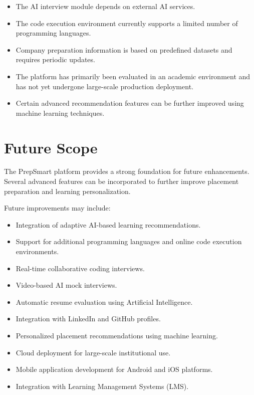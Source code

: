 \begin{itemize}

\item The AI interview module depends on external AI services.

\item The code execution environment currently supports a limited number of programming languages.

\item Company preparation information is based on predefined datasets and requires periodic updates.

\item The platform has primarily been evaluated in an academic environment and has not yet undergone large-scale production deployment.

\item Certain advanced recommendation features can be further improved using machine learning techniques.

\end{itemize}

\section{Future Scope}

The PrepSmart platform provides a strong foundation for future enhancements. Several advanced features can be incorporated to further improve placement preparation and learning personalization.

Future improvements may include:

\begin{itemize}

\item Integration of adaptive AI-based learning recommendations.

\item Support for additional programming languages and online code execution environments.

\item Real-time collaborative coding interviews.

\item Video-based AI mock interviews.

\item Automatic resume evaluation using Artificial Intelligence.

\item Integration with LinkedIn and GitHub profiles.

\item Personalized placement recommendations using machine learning.

\item Cloud deployment for large-scale institutional use.

\item Mobile application development for Android and iOS platforms.

\item Integration with Learning Management Systems (LMS).

\end{itemize}

